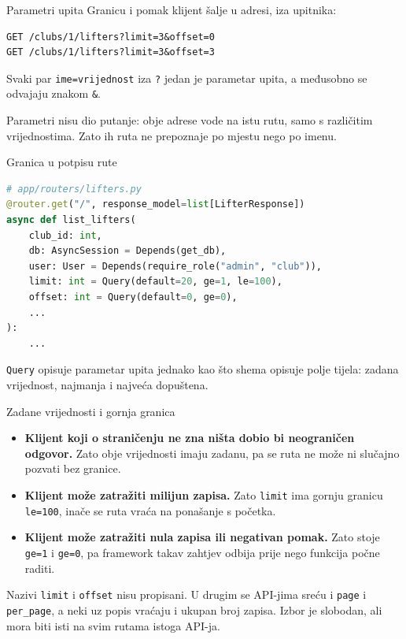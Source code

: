 \begin{frame}[fragile]{Parametri upita}
Granicu i pomak klijent šalje u adresi, iza upitnika:

\begin{lstlisting}
GET /clubs/1/lifters?limit=3&offset=0
GET /clubs/1/lifters?limit=3&offset=3
\end{lstlisting}

\vspace{0.6em}
Svaki par \texttt{ime=vrijednost} iza \texttt{?} jedan je parametar upita, a međusobno se odvajaju znakom \texttt{\&}.

\vspace{0.9em}
Parametri nisu dio putanje: obje adrese vode na istu rutu, samo s različitim vrijednostima. Zato ih ruta ne prepoznaje po mjestu nego po imenu.
\end{frame}

\begin{frame}[fragile]{Granica u potpisu rute}
\begin{lstlisting}[language=python]
# app/routers/lifters.py
@router.get("/", response_model=list[LifterResponse])
async def list_lifters(
    club_id: int,
    db: AsyncSession = Depends(get_db),
    user: User = Depends(require_role("admin", "club")),
    limit: int = Query(default=20, ge=1, le=100),
    offset: int = Query(default=0, ge=0),
    ...
):
    ...
\end{lstlisting}

\vspace{0.3em}
\texttt{Query} opisuje parametar upita jednako kao što shema opisuje polje tijela: zadana vrijednost, najmanja i najveća dopuštena.
\end{frame}

\begin{frame}{Zadane vrijednosti i gornja granica}
\begin{itemize}
  \item \textbf{Klijent koji o straničenju ne zna ništa dobio bi neograničen odgovor.} Zato obje vrijednosti imaju zadanu, pa se ruta ne može ni slučajno pozvati bez granice.
  \item \textbf{Klijent može zatražiti milijun zapisa.} Zato \texttt{limit} ima gornju granicu \texttt{le=100}, inače se ruta vraća na ponašanje s početka.
  \item \textbf{Klijent može zatražiti nula zapisa ili negativan pomak.} Zato stoje \texttt{ge=1} i \texttt{ge=0}, pa framework takav zahtjev odbija prije nego funkcija počne raditi.
\end{itemize}

\vspace{0.4em}
\begin{konvencija}
Nazivi \texttt{limit} i \texttt{offset} nisu propisani. U drugim se API-jima sreću i \texttt{page} i \texttt{per\_page}, a neki uz popis vraćaju i ukupan broj zapisa. Izbor je slobodan, ali mora biti isti na svim rutama istoga API-ja.
\end{konvencija}
\end{frame}

